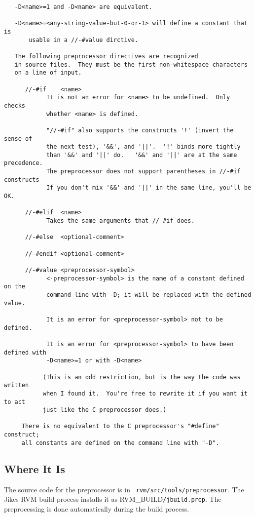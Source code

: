 \begin{verbatim}
   -D<name>=1 and -D<name> are equivalent.

   -D<name>=<any-string-value-but-0-or-1> will define a constant that is
       usable in a //-#value dirctive.

   The following preprocessor directives are recognized
   in source files.  They must be the first non-whitespace characters
   on a line of input.

      //-#if    <name>
            It is not an error for <name> to be undefined.  Only checks
            whether <name> is defined.

            "//-#if" also supports the constructs '!' (invert the sense of 
            the next test), '&&', and '||'.  '!' binds more tightly 
            than '&&' and '||' do.   '&&' and '||' are at the same precedence.
            The preprocessor does not support parentheses in //-#if constructs
            If you don't mix '&&' and '||' in the same line, you'll be OK.

      //-#elif  <name>
            Takes the same arguments that //-#if does. 

      //-#else  <optional-comment>

      //-#endif <optional-comment>

      //-#value <preprocessor-symbol>
            <-preprocessor-symbol> is the name of a constant defined on the
            command line with -D; it will be replaced with the defined value.

            It is an error for <preprocessor-symbol> not to be defined.

            It is an error for <preprocessor-symbol> to have been defined with
            -D<name>=1 or with -D<name>

           (This is an odd restriction, but is the way the code was written
           when I found it.  You're free to rewrite it if you want it to act
           just like the C preprocessor does.)

     There is no equivalent to the C preprocessor's "#define" construct;
     all constants are defined on the command line with "-D".
\end{verbatim}

\subsection{Where It Is}

The source code for the preprocessor is in {\tt
rvm/src/tools/preprocessor}.  The Jikes RVM build process installs it
as RVM\_BUILD{\tt /jbuild.prep}.  The preprocessing is done automatically
during the build process.


